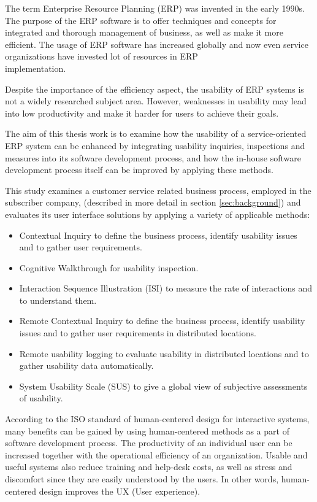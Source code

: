 \documentclass[12pt,a4paper,oneside,pdftex]{report}
\begin{document}
The term Enterprise Resource Planning (ERP) was invented in the early 1990s.\cite{RefWorks:3} The purpose of the ERP software is to offer techniques and concepts for integrated and thorough management of business, as well as make it more efficient.
The usage of ERP software has increased globally and now even service organizations have invested lot of resources in ERP \\  implementation.\cite{RefWorks:1, RefWorks:7} 

Despite the importance of the efficiency aspect, the usability of ERP systems is not a widely researched subject area. However, weaknesses in usability may lead into low productivity and make it harder for users to achieve their goals.\cite{RefWorks:2} 

The aim of this thesis work is to examine how the usability of a service-oriented ERP system can be enhanced by integrating usability inquiries, inspections and measures into its software development process, and how the in-house software development process itself can be improved by applying these methods.


This study examines a customer service related business process, employed in the subscriber company, (described in more detail in section \ref{sec:background}) and evaluates its user interface solutions by applying a variety of applicable methods:
\begin{itemize}
\item Contextual Inquiry to define the business process, identify usability issues and to gather user requirements.
\item Cognitive Walkthrough for usability inspection.
\item Interaction Sequence Illustration (ISI) to measure the rate of interactions and to understand them.
\item Remote Contextual Inquiry to define the business process, identify usability issues and to gather user requirements in distributed locations.
\item Remote usability logging to evaluate usability in distributed locations and to gather usability data automatically.
\item System Usability Scale (SUS) to give a global view of subjective assessments of usability.
\end{itemize}

\indent According to the ISO standard of human-centered design for interactive systems, many benefits can be gained by using human-centered methods as a part of software development process. The productivity of an individual user can be increased together with the operational efficiency of an organization. Usable and useful systems also reduce training and help-desk costs, as well as stress and discomfort since they are easily understood by the users. In other words, human-centered design improves the UX (User experience). \cite{RefWorks:16}
\end{document}
